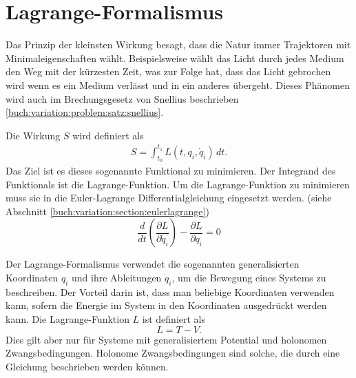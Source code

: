 \section{Lagrange-Formalismus}
Das Prinzip der kleinsten Wirkung besagt, dass die Natur immer Trajektoren mit Minimaleigenschaften wählt.
Beispielsweise wählt das Licht durch jedes Medium den Weg mit der kürzesten Zeit, was zur Folge hat,
dass das Licht gebrochen wird wenn es ein Medium verlässt und in ein anderes übergeht.
Dieses Phänomen wird auch im Brechungsgesetz von Snellius beschrieben \ref{buch:variation:problem:satz:snellius}.

Die Wirkung \(S\) wird definiert als
\begin{align}
    S = \int_{t_0}^{t_1} L(t,q_i,\dot{q}_i) \, dt.
\end{align}
Das Ziel ist es dieses sogenannte Funktional zu minimieren.
Der Integrand des Funktionals ist die Lagrange-Funktion.
Um die Lagrange-Funktion zu minimieren muss sie in die Euler-Lagrange Differentialgleichung eingesetzt werden.
(siehe Abschnitt \ref{buch:variation:section:eulerlagrange})
\begin{equation}
    \frac{d}{dt} \left( \frac{\partial L}{\partial \dot{q}_i} \right) 
    - \frac{\partial L}{\partial q_i} = 0
\end{equation}

Der Lagrange-Formalismus verwendet die sogenannten generalisierten 
Koordinaten \(q_i\) und ihre Ableitungen \(\dot{q}_i\), um die Bewegung eines Systems zu beschreiben.
Der Vorteil darin ist, dass man beliebige Koordinaten verwenden kann, sofern die Energie im System in 
den Koordinaten ausgedrückt werden kann.
Die Lagrange-Funktion \(L\) ist definiert als
\begin{equation}
    L = T - V.
    \label{eq:lagrange} 
\end{equation}
Dies gilt aber nur für Systeme mit generalisiertem Potential und holonomen Zwangsbedingungen.
Holonome Zwangsbedingungen sind solche, die durch eine Gleichung beschrieben werden können.%


